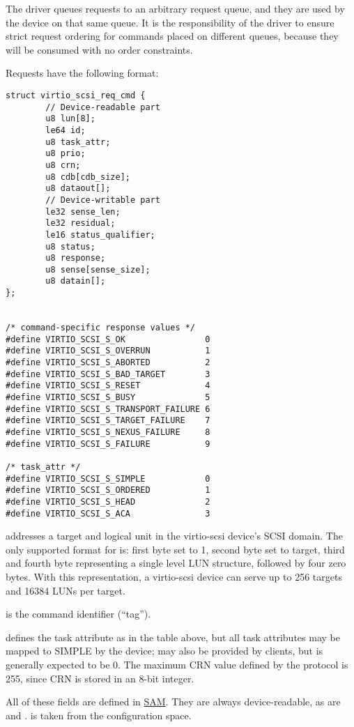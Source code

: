 The driver queues requests to an arbitrary request queue, and
they are used by the device on that same queue. It is the
responsibility of the driver to ensure strict request ordering
for commands placed on different queues, because they will be
consumed with no order constraints.

Requests have the following format:

\begin{lstlisting}
struct virtio_scsi_req_cmd {
        // Device-readable part
        u8 lun[8];
        le64 id;
        u8 task_attr;
        u8 prio;
        u8 crn;
        u8 cdb[cdb_size];
        u8 dataout[];
        // Device-writable part
        le32 sense_len;
        le32 residual;
        le16 status_qualifier;
        u8 status;
        u8 response;
        u8 sense[sense_size];
        u8 datain[];
};


/* command-specific response values */
#define VIRTIO_SCSI_S_OK                0
#define VIRTIO_SCSI_S_OVERRUN           1
#define VIRTIO_SCSI_S_ABORTED           2
#define VIRTIO_SCSI_S_BAD_TARGET        3
#define VIRTIO_SCSI_S_RESET             4
#define VIRTIO_SCSI_S_BUSY              5
#define VIRTIO_SCSI_S_TRANSPORT_FAILURE 6
#define VIRTIO_SCSI_S_TARGET_FAILURE    7
#define VIRTIO_SCSI_S_NEXUS_FAILURE     8
#define VIRTIO_SCSI_S_FAILURE           9

/* task_attr */
#define VIRTIO_SCSI_S_SIMPLE            0
#define VIRTIO_SCSI_S_ORDERED           1
#define VIRTIO_SCSI_S_HEAD              2
#define VIRTIO_SCSI_S_ACA               3
\end{lstlisting}

 addresses a target and logical unit in the
virtio-scsi device's SCSI domain. The only supported format for
 is: first byte set to 1, second byte set to target,
third and fourth byte representing a single level LUN structure,
followed by four zero bytes. With this representation, a
virtio-scsi device can serve up to 256 targets and 16384 LUNs per
target.

 is the command identifier (``tag'').

 defines
the task attribute as in the table above, but all task attributes
may be mapped to SIMPLE by the device;  may also be provided
by clients, but is generally expected to be 0. The maximum CRN
value defined by the protocol is 255, since CRN is stored in an
8-bit integer.

All of these fields are defined in \hyperref[intro:SAM]{SAM}. They are always
device-readable, as are  and .  is
taken from the configuration space.

